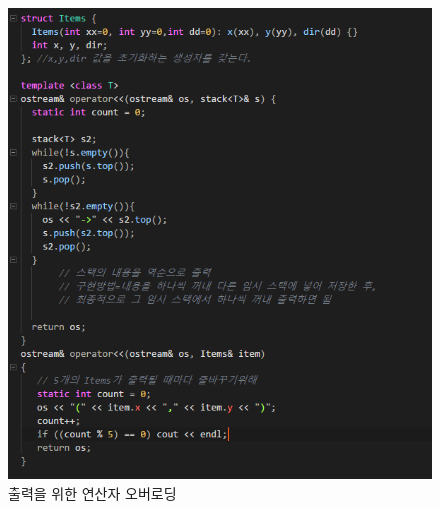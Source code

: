 \documentclass[a4paper,12pt]{article}
\begin{document}
\newpage
\begin{figure}[t]\vspace*{4pt} 
\centerline{\includegraphics[width=1.0\columnwidth]{maze2}} 
\caption{출력을 위한 연산자 오버로딩}\vspace*{-6pt} 
\label{figure:matrixb} 
\end{figure} 
\end{document}
